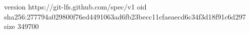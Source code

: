version https://git-lfs.github.com/spec/v1
oid sha256:277794a029800f76ed4491063ad6fb23becc11cfaeaecd6c34f3d18f91c6d297
size 349700
